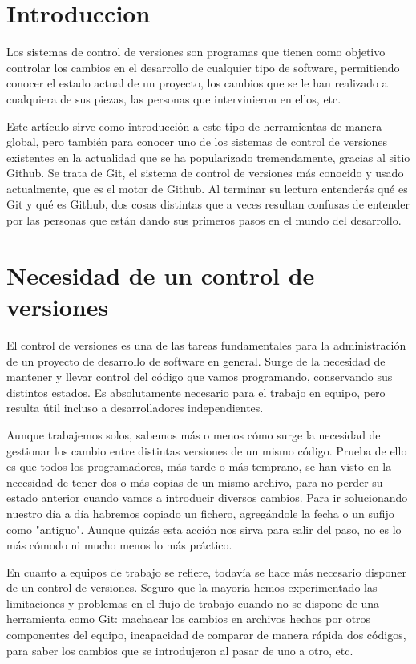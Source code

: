 \documentclass[12pt,spanish]{article}
\begin{document}
\section{Introduccion} 
Los sistemas de control de versiones son programas que tienen como objetivo controlar los cambios en el desarrollo de cualquier tipo de software, permitiendo conocer el estado actual de un proyecto, los cambios que se le han realizado a cualquiera de sus piezas, las personas que intervinieron en ellos, etc.

Este artículo sirve como introducción a este tipo de herramientas de manera global, pero también para conocer uno de los sistemas de control de versiones existentes en la actualidad que se ha popularizado tremendamente, gracias al sitio Github. Se trata de Git, el sistema de control de versiones más conocido y usado actualmente, que es el motor de Github. Al terminar su lectura entenderás qué es Git y qué es Github, dos cosas distintas que a veces resultan confusas de entender por las personas que están dando sus primeros pasos en el mundo del desarrollo.

\section{Necesidad de un control de versiones} 
El control de versiones es una de las tareas fundamentales para la administración de un proyecto de desarrollo de software en general. Surge de la necesidad de mantener y llevar control del código que vamos programando, conservando sus distintos estados. Es absolutamente necesario para el trabajo en equipo, pero resulta útil incluso a desarrolladores independientes.

Aunque trabajemos solos, sabemos más o menos cómo surge la necesidad de gestionar los cambio entre distintas versiones de un mismo código. Prueba de ello es que todos los programadores, más tarde o más temprano, se han visto en la necesidad de tener dos o más copias de un mismo archivo, para no perder su estado anterior cuando vamos a introducir diversos cambios. Para ir solucionando nuestro día a día habremos copiado un fichero, agregándole la fecha o un sufijo como "antiguo". Aunque quizás esta acción nos sirva para salir del paso, no es lo más cómodo ni mucho menos lo más práctico.

En cuanto a equipos de trabajo se refiere, todavía se hace más necesario disponer de un control de versiones. Seguro que la mayoría hemos experimentado las limitaciones y problemas en el flujo de trabajo cuando no se dispone de una herramienta como Git: machacar los cambios en archivos hechos por otros componentes del equipo, incapacidad de comparar de manera rápida dos códigos, para saber los cambios que se introdujeron al pasar de uno a otro, etc.
\end{document}
